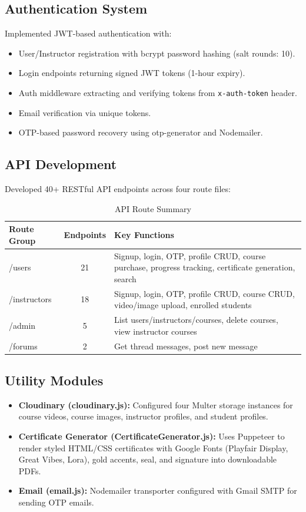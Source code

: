 \documentclass[12pt,a4paper]{report}
\begin{document}
\subsection{Authentication System}
Implemented JWT-based authentication with:
\begin{itemize}
    \item User/Instructor registration with bcrypt password hashing (salt rounds: 10).
    \item Login endpoints returning signed JWT tokens (1-hour expiry).
    \item Auth middleware extracting and verifying tokens from \texttt{x-auth-token} header.
    \item Email verification via unique tokens.
    \item OTP-based password recovery using otp-generator and Nodemailer.
\end{itemize}

\subsection{API Development}
Developed 40+ RESTful API endpoints across four route files:

\begin{table}[H]
\centering
\caption{API Route Summary}
\begin{tabular}{@{}lcp{6cm}@{}}
\toprule
\textbf{Route Group} & \textbf{Endpoints} & \textbf{Key Functions} \\ \midrule
/users & 21 & Signup, login, OTP, profile CRUD, course purchase, progress tracking, certificate generation, search \\
/instructors & 18 & Signup, login, OTP, profile CRUD, course CRUD, video/image upload, enrolled students \\
/admin & 5 & List users/instructors/courses, delete courses, view instructor courses \\
/forums & 2 & Get thread messages, post new message \\ \bottomrule
\end{tabular}
\end{table}

\subsection{Utility Modules}
\begin{itemize}
    \item \textbf{Cloudinary (cloudinary.js):} Configured four Multer storage instances for course videos, course images, instructor profiles, and student profiles.
    \item \textbf{Certificate Generator (CertificateGenerator.js):} Uses Puppeteer to render styled HTML/CSS certificates with Google Fonts (Playfair Display, Great Vibes, Lora), gold accents, seal, and signature into downloadable PDFs.
    \item \textbf{Email (email.js):} Nodemailer transporter configured with Gmail SMTP for sending OTP emails.
\end{itemize}
\end{document}
